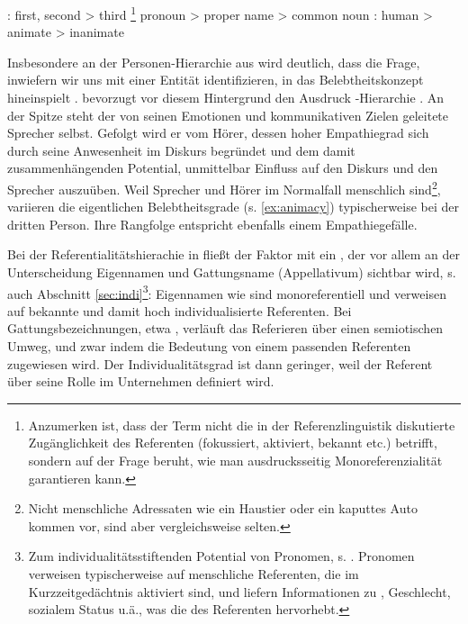 \begin{exe}
	\ex \label{ex:croft}
	\begin{xlist}
		\ex \label{ex:person} : first, second > third
		\ex \label{ex:referenz} \footnote{Anzumerken ist, dass der Term   nicht die in der Referenzlinguistik diskutierte Zugänglichkeit des Referenten (fokussiert, aktiviert, bekannt etc.) \parencite[vgl. etwa][]{Gundel1993} betrifft, sondern  auf der Frage beruht, wie man ausdrucksseitig Monoreferenzialität garantieren kann.} pronoun > proper name > common noun
		\ex \label{ex:animacy} : human > animate > inanimate
	\end{xlist}
\end{exe}
\noindent
Insbesondere an der Personen-Hierarchie aus  wird deutlich, dass die Frage, inwiefern wir uns mit einer Entität identifizieren, in das Belebtheitskonzept  hineinspielt \parencite[10--11 u. 25--26]{Yamamoto1999}. \textcite[307--308]{Langacker1991} bevorzugt vor diesem Hintergrund den Ausdruck -Hierarchie \parencite[ebenso][]{Lehmann2004a}. An der Spitze steht der von seinen Emotionen und kommunikativen Zielen geleitete Sprecher selbst. Gefolgt wird er vom Hörer, dessen hoher Empathiegrad sich durch seine Anwesenheit im Diskurs begründet und dem damit zusammenhängenden Potential, unmittelbar Einfluss auf den Diskurs und den Sprecher auszuüben.  Weil Sprecher und Hörer im Normalfall menschlich sind\footnote{Nicht menschliche Adressaten wie ein Haustier oder ein kaputtes Auto kommen vor, sind aber vergleichsweise selten.}, variieren die eigentlichen Belebtheitsgrade   (s. \ref{ex:animacy}) typischerweise bei der dritten Person. Ihre Rangfolge entspricht ebenfalls einem Empathiegefälle. 

Bei der Referentialitätshierachie  in  fließt der Faktor  mit ein \parencite{Timberlake1977,Hopper1980,Dahl1996,Fraurud1996,Yamamoto1999}, der vor allem an der Unterscheidung Eigennamen  und Gattungsname  (Appellativum) sichtbar wird, s. auch Abschnitt \ref{sec:indi}\footnote{Zum individualitätsstiftenden  Potential von  Pronomen, s. \textcite[29--31]{Yamamoto1999}. Pronomen  verweisen typischerweise auf menschliche Referenten, die im Kurzzeitgedächtnis aktiviert sind, und liefern Informationen zu , Geschlecht, sozialem Status u.ä., was die  des Referenten hervorhebt.}: Eigennamen  wie  sind monoreferentiell   und verweisen auf bekannte und damit hoch individualisierte  Referenten. Bei  Gattungsbezeichnungen, etwa , verläuft das Referieren über einen semiotischen Umweg, und zwar indem die Bedeutung von  einem passenden Referenten zugewiesen wird. Der Individualitätsgrad  ist dann geringer, weil der Referent über seine Rolle im Unternehmen definiert wird.

